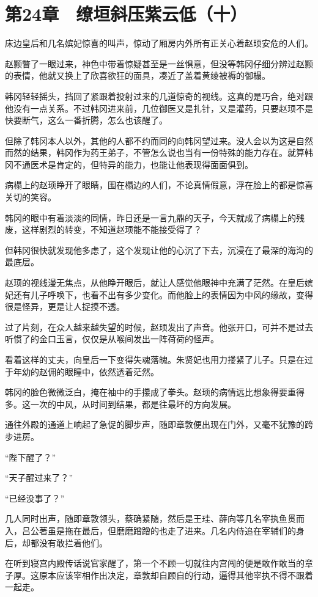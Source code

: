 \section{第24章　缭垣斜压紫云低（十）}

床边皇后和几名嫔妃惊喜的叫声，惊动了厢房内外所有正关心着赵顼安危的人们。

赵颢瞥了一眼过来，神色中带着惊疑甚至是一丝惧意，但没等韩冈仔细分辨过赵颢的表情，他就又换上了欣喜欲狂的面具，凑近了盖着黄绫被褥的御榻。

韩冈轻轻摇头，挡回了紧跟着投射过来的几道惊奇的视线。这真的是巧合，绝对跟他没有一点关系。不过韩冈进来前，几位御医又是扎针，又是灌药，只要赵顼不是快要断气，这么一番折腾，怎么也该醒了。

但除了韩冈本人以外，其他的人都不约而同的向韩冈望过来。没人会以为这是自然而然的结果，韩冈作为药王弟子，不管怎么说也当有一份特殊的能力存在。就算韩冈不通医术是肯定的，但特异的能力，也能让他表现得面面俱到。

病榻上的赵顼睁开了眼睛，围在榻边的人们，不论真情假意，浮在脸上的都是惊喜关切的笑容。

韩冈的眼中有着淡淡的同情，昨日还是一言九鼎的天子，今天就成了病榻上的残废，这样剧烈的转变，不知道赵顼能不能接受得了？

但韩冈很快就发现他多虑了，这个发现让他的心沉了下去，沉浸在了最深的海沟的最底层。

赵顼的视线漫无焦点，从他睁开眼后，就让人感觉他眼神中充满了茫然。在皇后嫔妃还有儿子呼唤下，也看不出有多少变化。而他脸上的表情因为中风的缘故，变得很是怪异，更是让人捉摸不透。

过了片刻，在众人越来越失望的时候，赵顼发出了声音。他张开口，可并不是过去听惯了的金口玉言，仅仅是从喉间发出一阵荷荷的怪声。

看着这样的丈夫，向皇后一下变得失魂落魄。朱贤妃也用力搂紧了儿子。只是在过于年幼的赵佣的眼瞳中，依然透着茫然。

韩冈的脸色微微泛白，掩在袖中的手攥成了拳头。赵顼的病情远比想象得要重得多。这一次的中风，从时间到结果，都是往最坏的方向发展。

通往外殿的通道上响起了急促的脚步声，随即章敦便出现在门外，又毫不犹豫的跨步进房。

“陛下醒了？”

“天子醒过来了？”

“已经没事了？”

几人同时出声，随即章敦领头，蔡确紧随，然后是王珪、薛向等几名宰执鱼贯而入，吕公著虽是拖在最后，但磨磨蹭蹭的也走了进来。几名内侍追在宰辅们的身后，却都没有敢拦着他们。

在听到寝宫内殿传话说官家醒了，第一个不顾一切就往内宫闯的便是敢作敢当的章子厚。这原本应该宰相作出决定，章敦却自顾自的行动，逼得其他宰执不得不跟着一起走。

